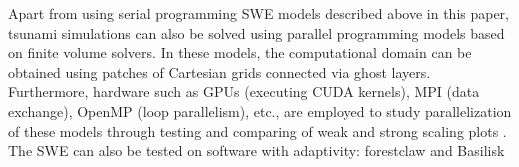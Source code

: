 \documentclass[10pt,a4paper]{article}
\begin{document}
	Apart from using serial programming SWE models described above in this paper, tsunami simulations can also be solved using parallel programming models based on finite volume solvers.  In these models, the computational domain can be obtained using patches of Cartesian grids connected via ghost layers.  Furthermore, hardware such as GPUs (executing CUDA kernels), MPI (data exchange), OpenMP (loop parallelism), etc., are employed to study parallelization of these models through testing and comparing of weak and strong scaling plots \citep{qi-le-mo:2018}.  The SWE can also be tested on software with adaptivity: forestclaw \citep{ca-bu:2017} and  Basilisk \citep{po:2015}
	
	
	
	
	
	
	
	
	
\end{document}
